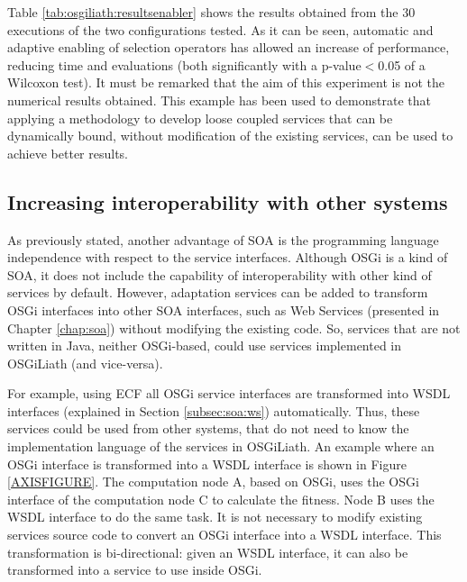 Table \ref{tab:osgiliath:resultsenabler} shows the results obtained from the 30 executions of the two configurations tested. As it can be seen, automatic and adaptive enabling of selection operators has allowed an increase of performance, reducing time and evaluations (both significantly with a p-value$<$0.05 of a Wilcoxon test). It must be remarked that the aim of this experiment is not the numerical results obtained. This example has been used to demonstrate that applying a methodology to develop loose coupled services that can be dynamically bound, without modification of the existing services, can be used to achieve better results.


\subsection{Increasing interoperability with other systems}

As previously stated, another advantage of SOA is the programming
language independence with respect to the service interfaces. Although OSGi
is a kind of SOA, it does not include  the capability of
interoperability with other kind of services by default. However,
adaptation services can be added to transform OSGi interfaces into
other SOA interfaces, such as Web Services (presented in Chapter
\ref{chap:soa}) without modifying the existing code. So, services that are not written in Java, neither
OSGi-based, could use services implemented in OSGiLiath (and
vice-versa). 



For example, using ECF all OSGi service interfaces are
transformed into WSDL  interfaces (explained in Section \ref{subsec:soa:ws}) automatically. %
Thus, these services could be used from other systems, that do not
need to know the implementation language of the services in
OSGiLiath. An example where an OSGi interface is transformed into a
WSDL interface is shown in Figure \ref{AXISFIGURE}. %
The computation
node A, based on OSGi, uses the OSGi interface of the computation node
C to calculate the fitness. Node B uses the WSDL interface to do the
same task. It is not necessary to modify existing services source code
to convert an OSGi interface into a WSDL interface. This
transformation is bi-directional: given an WSDL interface, it can also
be transformed into a service to use inside OSGi. %

